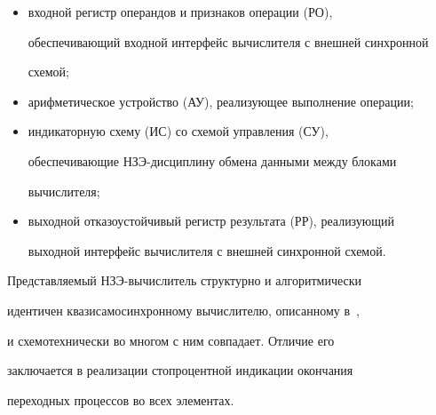    \begin{itemize}


   \item[$\bullet$]


   входной регистр операндов и признаков операции (РО),\linebreak 


обеспечивающий входной интерфейс вычислителя с внешней синхронной


схемой;


   \item[$\bullet$]


   арифметическое устройство (АУ), реализующее выполнение операции;


   \item[$\bullet$]


   индикаторную схему (ИС) со схемой управления (СУ),\linebreak 


обеспечивающие НЗЭ-дис\-цип\-ли\-ну обмена данными между блоками


вычислителя;\\[-9pt]


   \item[$\bullet$]


   выходной отказоустойчивый регистр результата (РР), реализующий


выходной интерфейс вычислителя с внешней синхронной схемой.


   \end{itemize}





   Представляемый НЗЭ-вы\-чис\-ли\-тель структурно и алгоритмически


идентичен квазисамосинхронному вычислителю, описанному в~\cite{4-1, 9-1}, 


и схемотехнически во многом с ним совпадает. Отличие его


заключается в реализации стопроцентной индикации окончания


переходных процессов во всех элементах.





